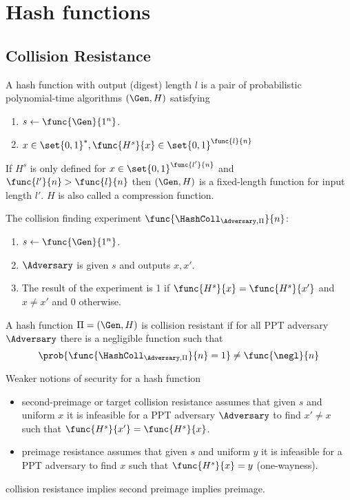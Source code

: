 \chapter{Hash functions}
\section{Collision Resistance}
\begin{definition}
    A hash function with output (digest) length \(l\) is a pair of probabilistic polynomial-time algorithms \((\Gen,H)\) satisfying 
    \begin{enumerate}
        \item \(s \gets \func{\Gen}{1^n}\).
        \item \(x \in \set{0,1}^{\ast}, \func{H^s}{x} \in \set{0,1}^{\func{l}{n}}\)
    \end{enumerate}
    If \(H^s\) is only defined for \(x \in \set{0,1}^{\func{l'}{n}}\) and \(\func{l'}{n} > \func{l}{n}\) then \((\Gen,H)\) is a fixed-length function for input length \(l'\). \(H\) is also called a compression function.
\end{definition}
The collision finding experiment \(\func{\HashColl_{\Adversary,\Pi}}{n}\):
\begin{enumerate}
    \item \(s \gets \func{\Gen}{1^n}\).
    \item \(\Adversary\) is given \(s\) and outputs \(x,x'\).
    \item The result of the experiment is 1 if \(\func{H^s}{x} = \func{H^s}{x'}\) and \(x \neq x'\) and 0 otherwise.
\end{enumerate}

\begin{definition}
    A hash function \(\Pi = (\Gen,H)\) is collision resistant if for all PPT adversary \(\Adversary\) there is a negligible function such that 
    \begin{equation*}
        \prob{\func{\HashColl_{\Adversary,\Pi}}{n} = 1} \neq \func{\negl}{n}
    \end{equation*}
\end{definition}
\begin{definition}
    Weaker notions of security for a hash function 
    \begin{itemize}
        \item second-preimage or target collision resistance assumes that given \(s\) and uniform \(x\) it is infeasible for a PPT adversary \(\Adversary\) to find \(x' \neq x\) such that \(\func{H^s}{x'} = \func{H^s}{x}\).
        \item preimage resistance assumes that given \(s\) and uniform \(y\) it is infeasible for a PPT adversary to find \(x\) such that \(\func{H^s}{x} = y\) (one-wayness).
    \end{itemize}
    collision resistance implies second preimage implies preimage.
\end{definition}

